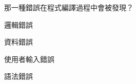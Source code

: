\ifx\ntpcNinetyThree\undefined[93學年基北區] \fi
那一種錯誤在程式編譯過程中會被發現？
  \begin{optionlist}
  \item 邏輯錯誤
  \item 資料錯誤
  \item 使用者輸入錯誤
  \item 語法錯誤\label{ntpc-93-a6}
  \end{optionlist}